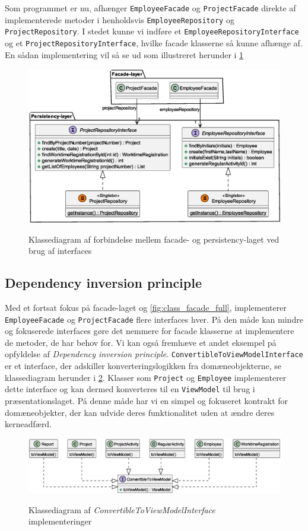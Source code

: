 Som programmet er nu, afhænger \texttt{EmployeeFacade} og \texttt{ProjectFacade} direkte af implementerede metoder i henholdsvis \texttt{EmployeeRepository} og \texttt{ProjectRepository}. I stedet kunne vi indføre et \texttt{EmployeeRepositoryInterface} og et \texttt{ProjectRepositoryInterface}, hvilke facade klasserne så kunne afhænge af. En sådan implementering vil så se ud som illustreret herunder i \cref{fig:class_facade_persistency_improved}
\begin{figure}[H]
  \centering
  \caption{Klassediagram af forbindelse mellem facade- og persistency-laget ved brug af interfaces}
  \includegraphics[width = 12cm]{ImplementationAndTest/Diagrams/ClassDiagrams/persistency_to_facade_example_improved.eps}
  \label{fig:class_facade_persistency_improved}
\end{figure}
\subsection{Dependency inversion principle} \label{sec:solid_d}
Med et fortsat fokus på facade-laget og \cref{fig:class_facade_full}, implementerer \texttt{EmployeeFacade} og \texttt{ProjectFacade} flere interfaces hver. På den måde kan mindre og fokuserede interfaces gøre det nemmere for facade klasserne at implementere de metoder, de har behov for.\newline
Vi kan også fremhæve et andet eksempel på opfyldelse af \textit{Dependency inversion principle}. \texttt{ConvertibleToViewModelInterface} er et interface, der adskiller konverteringslogikken fra domæneobjekterne, se klassediagram herunder i \cref{fig:class_convertible_example}. Klasser som \texttt{Project} og \texttt{Employee} implementerer dette interface og kan dermed konverteres til en \texttt{ViewModel} til brug i præsentationslaget. På denne måde har vi en simpel og fokuseret kontrakt for domæneobjekter, der kan udvide deres funktionalitet uden at ændre deres kerneadfærd.
\begin{figure}[H]
  \centering
  \caption{Klassediagram af \textit{ConvertibleToViewModelInterface} implementeringer}
  \includegraphics[width = \textwidth]{ImplementationAndTest/Diagrams/ClassDiagrams/ConvertibleToViewModel_diagram.eps}
  \label{fig:class_convertible_example}
\end{figure}